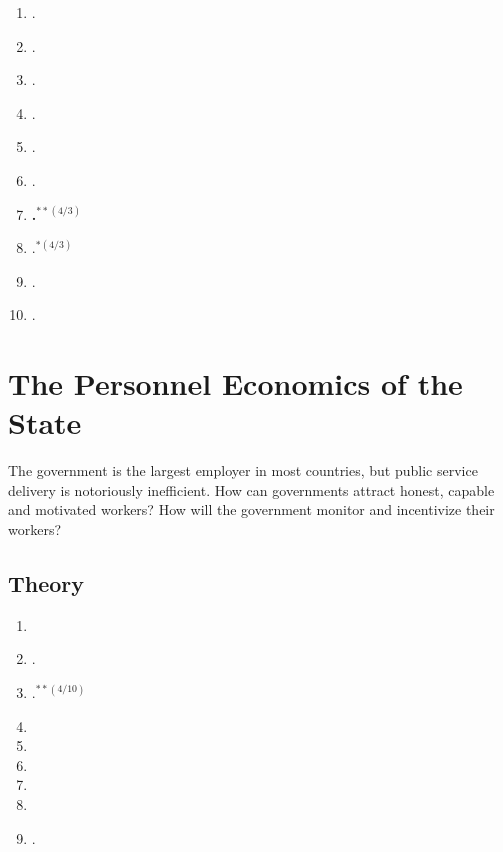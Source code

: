 \documentclass[11pt]{article}
\begin{document}
\begin{enumerate}
\item {}.
\item {}.
\item {}.
\item {}.
\item {}.
\item {}.
\item \textbf{.$^{**(4/3)}$}
\item {}.$^{*(4/3)}$
\item {}.
\item {}.
\end{enumerate}

\section{The Personnel Economics of the State}
The government is the largest employer in most countries, but public service delivery is notoriously inefficient. How can governments attract honest, capable and motivated workers? How will the government monitor and incentivize their workers?


\subsection{Theory}

\begin{enumerate}
\item {}
\item {}.
\item \textbf{}.$^{**(4/10)}$
\item {}
\item {}
\item {}
\item {}
\item {}
\item {}.
\end{enumerate}
\end{document}
